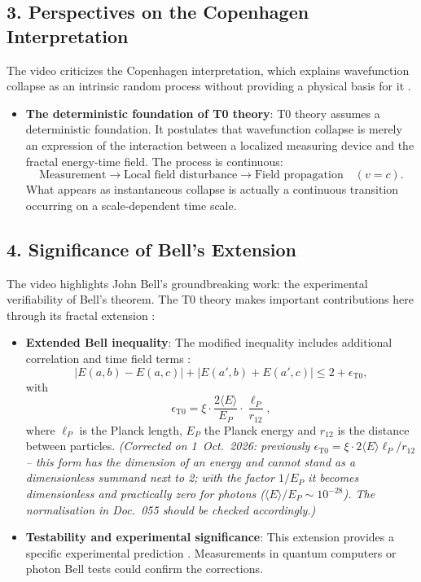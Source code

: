 	\subsection*{3. Perspectives on the Copenhagen Interpretation}
	
	The video criticizes the Copenhagen interpretation, which explains wavefunction collapse as an intrinsic random process without providing a physical basis for it \cite{VideoBell2024}.
	
	\begin{itemize}
		\item \textbf{The deterministic foundation of T0 theory}: T0 theory assumes a deterministic foundation. It postulates that wavefunction collapse is merely an expression of the interaction between a localized measuring device and the fractal energy-time field. The process is continuous:
		\[
		\text{Measurement} \rightarrow \text{Local field disturbance} \rightarrow \text{Field propagation} \quad (v = c).
		\]
		What appears as instantaneous collapse is actually a continuous transition occurring on a scale-dependent time scale.
	\end{itemize}
	
	\subsection*{4. Significance of Bell's Extension}
	
	The video highlights John Bell's groundbreaking work: the experimental verifiability of Bell's theorem. The T0 theory makes important contributions here through its fractal extension \cite{DynMassePhotonenNichtlokalEn, NoGoEn}:
	
	\begin{itemize}
		\item \textbf{Extended Bell inequality}: The modified inequality includes additional correlation and time field terms \cite{DynMassePhotonenNichtlokalEn}:
		\[
		|E(a,b) - E(a,c)| + |E(a',b) + E(a',c)| \leq 2 + \epsilon_{\mathrm{T0}},
		\]
		with
		\[
		\epsilon_{\mathrm{T0}} = \xi \cdot \frac{2\langle E \rangle}{E_P} \cdot \frac{\ell_P}{r_{12}},
		\]
		where $\ell_P$ is the Planck length, $E_P$ the Planck energy and $r_{12}$ is the distance between particles. \textit{(Corrected on 1~Oct.~2026: previously $\epsilon_{\mathrm{T0}} = \xi \cdot 2\langle E \rangle \ell_P/r_{12}$ -- this form has the dimension of an energy and cannot stand as a dimensionless summand next to 2; with the factor $1/E_P$ it becomes dimensionless and practically zero for photons ($\langle E \rangle/E_P \sim 10^{-28}$). The normalisation in Doc.~055 should be checked accordingly.)}
		
		\item \textbf{Testability and experimental significance}: This extension provides a specific experimental prediction \cite{023_Bell_En_ch}. Measurements in quantum computers or photon Bell tests could confirm the corrections.
	\end{itemize}
	

